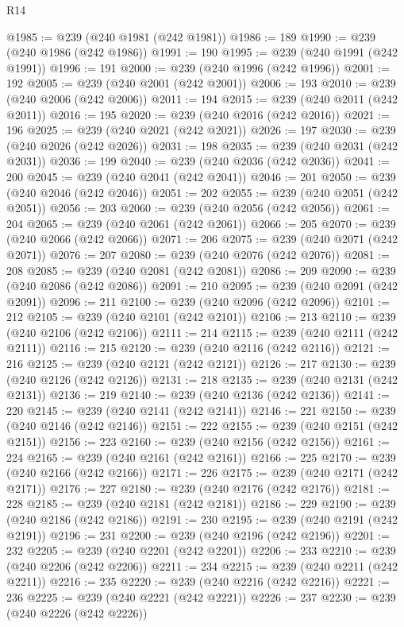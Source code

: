 \begin{lexlean}{R14}
\begin{coremodule}
@1985 := @239 (@240 @1981 (@242 @1981))
@1986 := 189
@1990 := @239 (@240 @1986 (@242 @1986))
@1991 := 190
@1995 := @239 (@240 @1991 (@242 @1991))
@1996 := 191
@2000 := @239 (@240 @1996 (@242 @1996))
@2001 := 192
@2005 := @239 (@240 @2001 (@242 @2001))
@2006 := 193
@2010 := @239 (@240 @2006 (@242 @2006))
@2011 := 194
@2015 := @239 (@240 @2011 (@242 @2011))
@2016 := 195
@2020 := @239 (@240 @2016 (@242 @2016))
@2021 := 196
@2025 := @239 (@240 @2021 (@242 @2021))
@2026 := 197
@2030 := @239 (@240 @2026 (@242 @2026))
@2031 := 198
@2035 := @239 (@240 @2031 (@242 @2031))
@2036 := 199
@2040 := @239 (@240 @2036 (@242 @2036))
@2041 := 200
@2045 := @239 (@240 @2041 (@242 @2041))
@2046 := 201
@2050 := @239 (@240 @2046 (@242 @2046))
@2051 := 202
@2055 := @239 (@240 @2051 (@242 @2051))
@2056 := 203
@2060 := @239 (@240 @2056 (@242 @2056))
@2061 := 204
@2065 := @239 (@240 @2061 (@242 @2061))
@2066 := 205
@2070 := @239 (@240 @2066 (@242 @2066))
@2071 := 206
@2075 := @239 (@240 @2071 (@242 @2071))
@2076 := 207
@2080 := @239 (@240 @2076 (@242 @2076))
@2081 := 208
@2085 := @239 (@240 @2081 (@242 @2081))
@2086 := 209
@2090 := @239 (@240 @2086 (@242 @2086))
@2091 := 210
@2095 := @239 (@240 @2091 (@242 @2091))
@2096 := 211
@2100 := @239 (@240 @2096 (@242 @2096))
@2101 := 212
@2105 := @239 (@240 @2101 (@242 @2101))
@2106 := 213
@2110 := @239 (@240 @2106 (@242 @2106))
@2111 := 214
@2115 := @239 (@240 @2111 (@242 @2111))
@2116 := 215
@2120 := @239 (@240 @2116 (@242 @2116))
@2121 := 216
@2125 := @239 (@240 @2121 (@242 @2121))
@2126 := 217
@2130 := @239 (@240 @2126 (@242 @2126))
@2131 := 218
@2135 := @239 (@240 @2131 (@242 @2131))
@2136 := 219
@2140 := @239 (@240 @2136 (@242 @2136))
@2141 := 220
@2145 := @239 (@240 @2141 (@242 @2141))
@2146 := 221
@2150 := @239 (@240 @2146 (@242 @2146))
@2151 := 222
@2155 := @239 (@240 @2151 (@242 @2151))
@2156 := 223
@2160 := @239 (@240 @2156 (@242 @2156))
@2161 := 224
@2165 := @239 (@240 @2161 (@242 @2161))
@2166 := 225
@2170 := @239 (@240 @2166 (@242 @2166))
@2171 := 226
@2175 := @239 (@240 @2171 (@242 @2171))
@2176 := 227
@2180 := @239 (@240 @2176 (@242 @2176))
@2181 := 228
@2185 := @239 (@240 @2181 (@242 @2181))
@2186 := 229
@2190 := @239 (@240 @2186 (@242 @2186))
@2191 := 230
@2195 := @239 (@240 @2191 (@242 @2191))
@2196 := 231
@2200 := @239 (@240 @2196 (@242 @2196))
@2201 := 232
@2205 := @239 (@240 @2201 (@242 @2201))
@2206 := 233
@2210 := @239 (@240 @2206 (@242 @2206))
@2211 := 234
@2215 := @239 (@240 @2211 (@242 @2211))
@2216 := 235
@2220 := @239 (@240 @2216 (@242 @2216))
@2221 := 236
@2225 := @239 (@240 @2221 (@242 @2221))
@2226 := 237
@2230 := @239 (@240 @2226 (@242 @2226))

\end{coremodule}
\end{lexlean}
